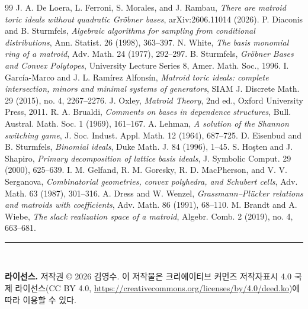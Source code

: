 \documentclass[11pt,a4paper]{article}
\theoremstyle{plain}
\theoremstyle{definition}
\begin{document}
\begin{thebibliography}{99}
 J. A. De Loera, L. Ferroni, S. Morales, and J. Rambau, \emph{There are matroid toric ideals without quadratic Gröbner bases}, arXiv:2606.11014 (2026).
 P. Diaconis and B. Sturmfels, \emph{Algebraic algorithms for sampling from conditional distributions}, Ann. Statist. 26 (1998), 363--397.
 N. White, \emph{The basis monomial ring of a matroid}, Adv. Math. 24 (1977), 292--297.
 B. Sturmfels, \emph{Gröbner Bases and Convex Polytopes}, University Lecture Series 8, Amer. Math. Soc., 1996.
 I. García-Marco and J. L. Ramírez Alfonsín, \emph{Matroid toric ideals: complete intersection, minors and minimal systems of generators}, SIAM J. Discrete Math. 29 (2015), no. 4, 2267--2276.
 J. Oxley, \emph{Matroid Theory}, 2nd ed., Oxford University Press, 2011.
 R. A. Brualdi, \emph{Comments on bases in dependence structures}, Bull. Austral. Math. Soc. 1 (1969), 161--167.
 A. Lehman, \emph{A solution of the Shannon switching game}, J. Soc. Indust. Appl. Math. 12 (1964), 687--725.
 D. Eisenbud and B. Sturmfels, \emph{Binomial ideals}, Duke Math. J. 84 (1996), 1--45.
 S. Ho{\lmfont ş}ten and J. Shapiro, \emph{Primary decomposition of lattice basis ideals}, J. Symbolic Comput. 29 (2000), 625--639.
 I. M. Gelfand, R. M. Goresky, R. D. MacPherson, and V. V. Serganova, \emph{Combinatorial geometries, convex polyhedra, and Schubert cells}, Adv. Math. 63 (1987), 301--316.
 A. Dress and W. Wenzel, \emph{Grassmann--Pl\"ucker relations and matroids with coefficients}, Adv. Math. 86 (1991), 68--110.
 M. Brandt and A. Wiebe, \emph{The slack realization space of a matroid}, Algebr. Comb. 2 (2019), no. 4, 663--681.
\end{thebibliography}

\par\vfill
\noindent\rule{\linewidth}{0.4pt}\\[0.2em]
{\small\noindent\textbf{라이선스.} 저작권 \copyright{} 2026 김영수. 이 저작물은 크리에이티브 커먼즈 저작자표시 4.0 국제 라이선스(CC BY 4.0, \url{https://creativecommons.org/licenses/by/4.0/deed.ko})에 따라 이용할 수 있다.\par}
\end{document}
